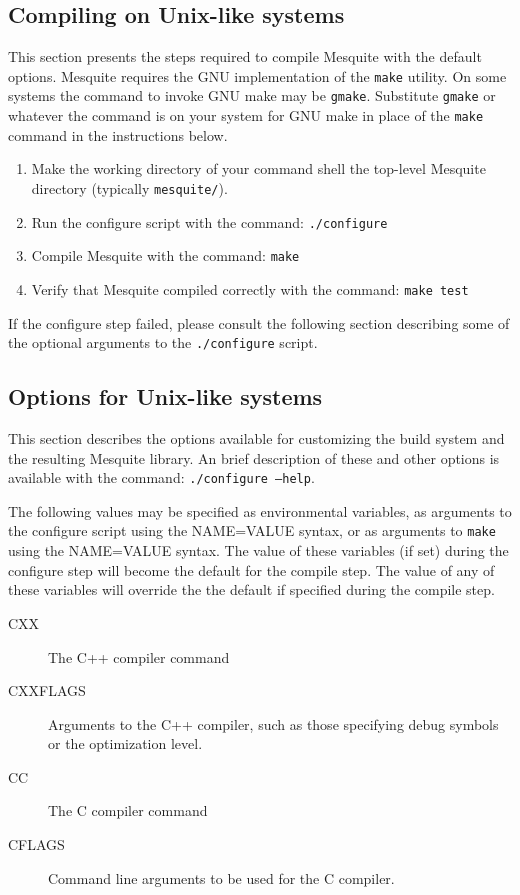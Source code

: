 \subsection{Compiling on Unix-like systems}
This section presents the steps required to compile Mesquite with the default
options.  Mesquite requires the GNU implementation of the \texttt{make} utility.
On some systems the command to invoke GNU make may be \texttt{gmake}.  Substitute
\texttt{gmake} or whatever the command is on your system for GNU make in place of
the \texttt{make} command in the instructions below.
\begin{enumerate}
\item Make the working directory of your command shell the top-level Mesquite
directory (typically \texttt{mesquite/}).
\item Run the configure script with the command: \texttt{./configure}
\item Compile Mesquite with the command: \texttt{make} 
\item Verify that Mesquite compiled correctly with the command: \texttt{make test}
\end{enumerate}
If the configure step failed, please consult the following section describing 
some of the optional arguments to the \texttt{./configure} script. 
\subsection{Options for Unix-like systems}
This section describes the options available for customizing the build
system and the resulting Mesquite library.  An brief description of these
and other options is available with the command: \texttt{./configure --help}.

\label{mes_vars_and_defs}
The following values may be specified as environmental variables, as arguments
to the configure script using the NAME=VALUE syntax, or as arguments to \texttt{make}
using the NAME=VALUE syntax.  The value of these variables (if set) during the
configure step will become the default for the compile step.  The value of any
of these variables will override the the default if specified during the compile
step.
\begin{description}
\item[CXX]       The C++ compiler command
\item[CXXFLAGS]  Arguments to the C++ compiler, such as those specifying 
debug symbols or the optimization level.
\item[CC]        The C compiler command
\item[CFLAGS]    Command line arguments to be used for the C compiler.
\end{description}

